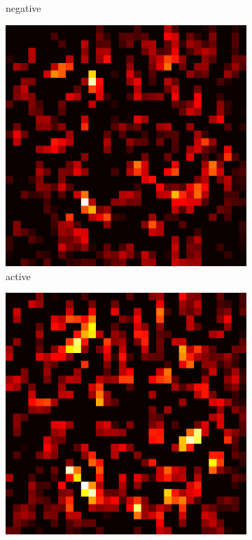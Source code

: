 \documentclass[preprint,12pt]{elsarticle}
\begin{document}
\begin{figure}
\begin{subfigure}{0.14\textwidth}
        \caption{negative}
    \end{subfigure}
    \hfill
    \begin{subfigure}{0.14\textwidth}
        \centering
        \includegraphics[width=\linewidth]{../visualizations/examples/cifar10/resnet18/active_saliency_map/1.png}
        \caption{active}
    \end{subfigure}
    \hfill
    \begin{subfigure}{0.14\textwidth}
        \centering
        \includegraphics[width=\linewidth]{../visualizations/examples/cifar10/resnet18/inactive_saliency_map/1.png}

\end{subfigure}
\end{figure}
\end{document}
